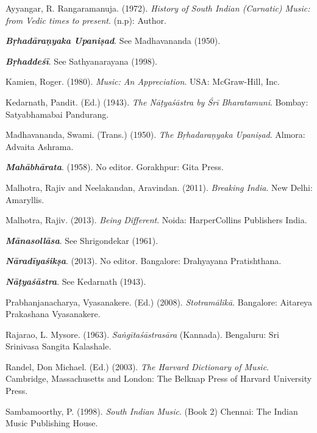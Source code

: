 \begin{thebibliography}{99}
\itemsep=0pt

  Ayyangar, R. Rangaramanuja. (1972). \textit{History of South Indian (Carnatic) Music: from Vedic times to present}. (n.p): Author.

  \textbf{\textit{Bṛhadāraṇyaka Upaniṣad}}. See Madhavananda (1950).

  \textbf{\textit{Bṛhaddeśī}}. See Sathyanarayana (1998).

  Kamien, Roger. (1980). \textit{Music: An Appreciation}. USA: McGraw-Hill, Inc.

  Kedarnath, Pandit. (Ed.) (1943). \textit{The Nāṭyaśāstra by Śrī Bharatamuni}. Bombay: Satyabhamabai Pandurang.

  Madhavananda, Swami. (Trans.) (1950). \textit{The Bṛhadaraṇyaka Upaniṣad}. Almora: Advaita Ashrama.

  \textbf{\textit{Mahābhārata}}. (1958). No editor. Gorakhpur: Gita Press.

  Malhotra, Rajiv and Neelakandan, Aravindan. (2011). \textit{Breaking India}. New Delhi: Amaryllis.

  Malhotra, Rajiv. (2013). \textit{Being Different}. Noida: HarperCollins Publishers India.

  \textbf{\textit{Mānasollāsa}}. See Shrigondekar (1961).

  \textbf{\textit{Nāradīyaśikṣa}}. (2013). No editor. Bangalore: Drahyayana Pratishthana.

  \textbf{\textit{Nāṭyaśāstra}}. See Kedarnath (1943).

  Prabhanjanacharya, Vyasanakere. (Ed.) (2008). \textit{Stotramālikā}. Bangalore: Aitareya Prakashana Vyasanakere.

  Rajarao, L. Mysore. (1963). \textit{Saṅgītaśāstrasāra} (Kannada). Bengaluru: Sri Srinivasa Sangita Kalashale.

  Randel, Don Michael. (Ed.) (2003). \textit{The Harvard Dictionary of Music}. Cambridge, Massachusetts and London: The Belknap Press of Harvard University Press.

  Sambamoorthy, P. (1998). \textit{South Indian Music}. (Book 2) Chennai: The Indian Music Publishing House.


\end{thebibliography}
